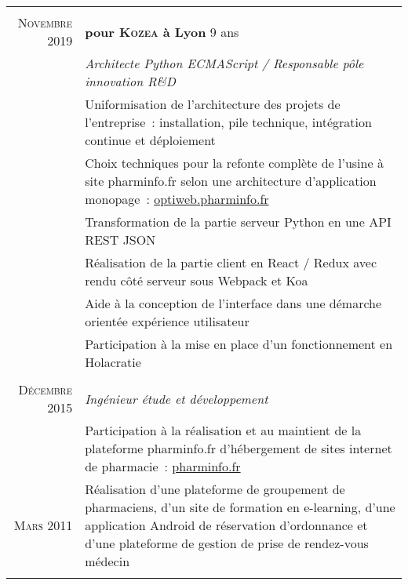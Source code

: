 \documentclass[a4paper,10pt]{article}
\begin{document}
  \begin{supertabular}{r|p{11cm}}
     \\
    \textsc{Novembre} 2019  & \textbf{pour \textsc{Kozea} à Lyon} \footnotesize{9 ans} \\
    & \emph{Architecte Python ECMAScript / Responsable pôle innovation R\&D} \\
    & \footnotesize{
      Uniformisation de l’architecture des projets de l’entreprise :
      installation, pile technique, intégration continue et déploiement
    } \\
    & \footnotesize{
      Choix techniques pour la refonte complète de l’usine à site pharminfo.fr
      selon une architecture d’application monopage :
      \href{https://optiweb.pharminfo.fr}{optiweb.pharminfo.fr}
    } \\
    & \footnotesize{
      Transformation de la partie serveur Python en une API REST JSON
    } \\
    & \footnotesize{
      Réalisation de la partie client en React / Redux avec rendu côté serveur
      sous Webpack et Koa
    } \\
    & \footnotesize{
      Aide à la conception de l’interface dans une démarche orientée expérience
      utilisateur
    } \\
    & \footnotesize{
      Participation à la mise en place d’un fonctionnement en Holacratie
    } \\
    \\
    \footnotesize{\textsc{Décembre} 2015} & \emph{Ingénieur étude et développement} \\
    & \footnotesize{
      Participation à la réalisation et au maintient de la plateforme
      pharminfo.fr d’hébergement de sites internet de pharmacie :
      \href{https://www.pharminfo.fr}{pharminfo.fr}
    } \\
     \footnotesize{\textsc{Mars} 2011}
    & \begin{minipage}[b]{0.85\textwidth}
      \footnotesize{
        Réalisation d’une plateforme de groupement de pharmaciens,
        d’un site de formation en e-learning,
        d’une application Android de réservation d’ordonnance et
        d’une plateforme de gestion de prise de rendez-vous médecin
      }
    \end{minipage} \\

     \\


\end{supertabular}
\end{document}
